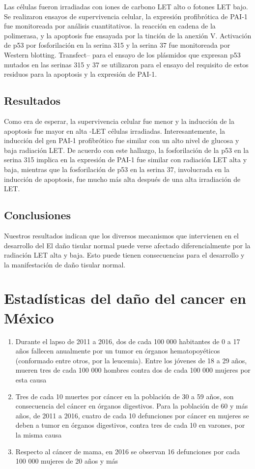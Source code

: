 \documentclass[]{article}
\begin{document}
Las células fueron irradiadas con iones de carbono LET alto o fotones LET bajo.
Se realizaron ensayos de supervivencia celular, la expresión profibrótica de PAI-1 fue monitoreada por análisis cuantitativos.
la reacción en cadena de la polimerasa, y la apoptosis fue ensayada por la tinción de la anexión V. Activación de p53
por fosforilación en la serina 315 y la serina 37 fue monitoreada por Western blotting. Transfect--
para el ensayo de los plásmidos que expresan p53 mutados en las serinas 315 y 37 se utilizaron para el ensayo del requisito
de estos residuos para la apoptosis y la expresión de PAI-1.

\subsection{Resultados}

 Como era de esperar, la supervivencia celular fue menor y la inducción de la apoptosis fue mayor en alta -LET
células irradiadas. Interesantemente, la inducción del gen PAI-1 profibrótico fue similar con un alto nivel de glucosa y
baja radiación LET. De acuerdo con este hallazgo, la fosforilación de la p53 en la serina 315 implica
en la expresión de PAI-1 fue similar con radiación LET alta y baja, mientras que la fosforilación de
p53 en la serina 37, involucrada en la inducción de apoptosis, fue mucho más alta después de una alta irradiación de LET.

\subsection{Conclusiones}

Nuestros resultados indican que los diversos mecanismos que intervienen en el desarrollo del
El daño tisular normal puede verse afectado diferencialmente por la radiación LET alta y baja. Esto puede
tienen consecuencias para el desarrollo y la manifestación de daño tisular normal.\citep{Niemantsverdriet2012}\\

\section{Estadísticas del daño del cancer en México}

\begin{enumerate}
	\item Durante el lapso de 2011 a 2016, dos de cada 100 000 habitantes de 0 a 17 años
	fallecen anualmente por un tumor en órganos hematopoyéticos (conformado
	entre otros, por la leucemia). Entre los jóvenes de 18 a 29 años, mueren tres de
	cada 100 000 hombres contra dos de cada 100 000 mujeres por esta causa
	\item Tres de cada 10 muertes por cáncer en la población de 30 a 59 años, son
	consecuencia del cáncer en órganos digestivos. Para la población de 60 y más
	años, de 2011 a 2016, cuatro de cada 10 defunciones por cáncer en mujeres se
	deben a tumor en órganos digestivos, contra tres de cada 10 en varones, por la
	misma causa
	\item Respecto al cáncer de mama, en 2016 se observan 16 defunciones por cada
	100 000 mujeres de 20 años y más
\end{enumerate}
\end{document}

